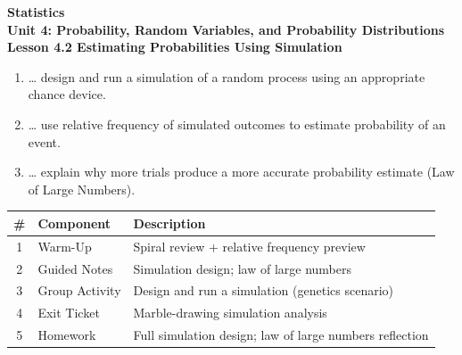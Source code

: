 \documentclass[10pt]{article}
\begin{document}
\vspace{-0.8in}

\begin{center}
  {\color{white}\textbf{\LARGE Statistics}}\\[4pt]
  {\color{skymid}\large\textbf{Unit 4: Probability, Random Variables, and Probability Distributions}}\\[6pt]
  {\color{white}\textbf{\large Lesson 4.2 \quad Estimating Probabilities Using Simulation}}
\end{center}

\vspace{0.22in}
\namedateperiod
\vspace{0.18in}

\begin{learningtargetbox}
\small
\begin{enumerate}[leftmargin=1.5em, itemsep=5pt]
  \item \ldots{} design and run a simulation of a random process using an appropriate chance device.
  \item \ldots{} use relative frequency of simulated outcomes to estimate probability of an event.
  \item \ldots{} explain why more trials produce a more accurate probability estimate (Law of Large Numbers).
\end{enumerate}
\end{learningtargetbox}

\vspace{0.14in}

\begin{tocbox}
\small
\renewcommand{\arraystretch}{1.5}
\begin{tabularx}{\linewidth}{@{} c l X @{}}
\rowcolor{sky}
\textbf{\#} & \textbf{Component} & \textbf{Description} \\
\midrule
1 & Warm-Up       & Spiral review + relative frequency preview \\
2 & Guided Notes  & Simulation design; law of large numbers \\
3 & Group Activity & Design and run a simulation (genetics scenario) \\
4 & Exit Ticket   & Marble-drawing simulation analysis \\
5 & Homework      & Full simulation design; law of large numbers reflection \\
\end{tabularx}
\end{tocbox}
\end{document}
